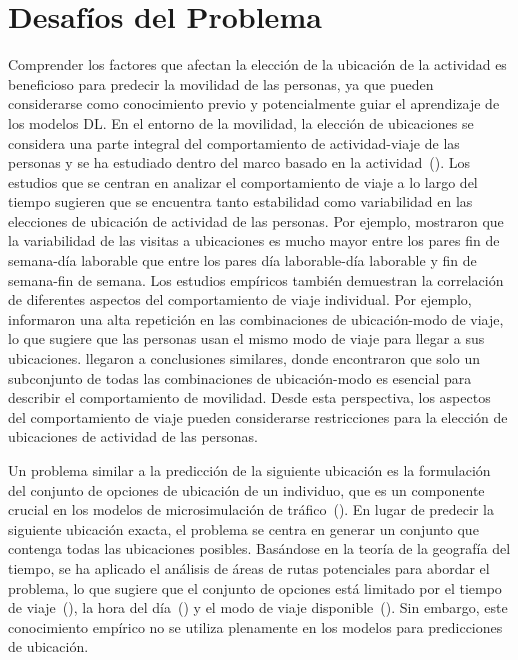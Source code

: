 \section{Desaf\'ios del Problema}
Comprender los factores que afectan la elección de la ubicación de 
la actividad es beneficioso para predecir la movilidad de las personas, 
ya que pueden considerarse como conocimiento previo y potencialmente 
guiar el aprendizaje de los modelos DL. En el entorno de la movilidad, 
la elección de ubicaciones se considera una parte integral
del comportamiento de actividad-viaje de las personas y se ha
estudiado dentro del marco basado en la actividad~(\cite{schonfelder2016urban}). 
Los estudios que se centran en analizar el comportamiento de 
viaje a lo largo del tiempo sugieren que se encuentra tanto 
estabilidad como variabilidad en las elecciones de ubicación 
de actividad de las personas. Por ejemplo, \cite{dharmowijoyo2017analysing} mostraron que la variabilidad de las visitas
a ubicaciones es mucho mayor entre los pares fin de 
semana-día laborable que entre los pares día laborable-día 
laborable y fin de semana-fin de semana. Los estudios 
empíricos también demuestran la correlación de diferentes
aspectos del comportamiento de viaje individual. Por ejemplo, \cite{susilo2014repetitions} informaron una alta repetición 
en las combinaciones de ubicación-modo de viaje, lo que sugiere que las 
personas usan el mismo modo de viaje para llegar a sus ubicaciones. 
\cite{hong2022conserved} llegaron a conclusiones similares, donde 
encontraron que solo un subconjunto de todas las combinaciones de 
ubicación-modo es esencial para describir el comportamiento de movilidad. 
Desde esta perspectiva, los aspectos del comportamiento de viaje 
pueden considerarse restricciones para la elección de ubicaciones de 
actividad de las personas.

Un problema similar a la predicción de la siguiente ubicación es la 
formulación del conjunto de opciones de ubicación de un individuo, que 
es un componente crucial en los modelos de microsimulación de 
tráfico~(\cite{mariante2018modeling}). En lugar de predecir la siguiente ubicación exacta, 
el problema se centra en generar un conjunto que contenga todas las 
ubicaciones posibles. Basándose en la teoría de la geografía del tiempo, 
se ha aplicado el análisis de áreas de rutas potenciales para abordar 
el problema, lo que sugiere que el conjunto de opciones está limitado 
por el tiempo de viaje~(\cite{scott2012modeling}), la hora del día~(\cite{yoon2012feasibility}) y el modo 
de viaje disponible~(\cite{neutens2007space}). Sin embargo, este conocimiento empírico 
no se utiliza plenamente en los modelos para predicciones de ubicación.

